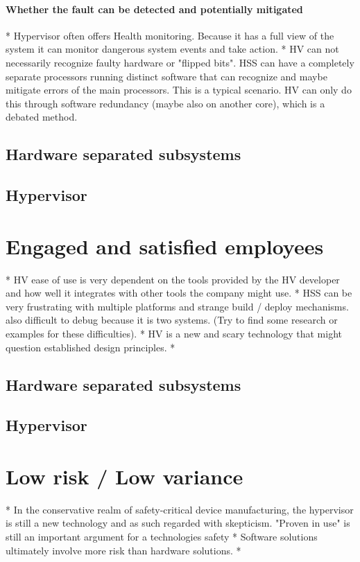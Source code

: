 \paragraph{Whether the fault can be detected and potentially mitigated}
* Hypervisor often offers Health monitoring. Because it has a full view of the system it can monitor dangerous system events and take action.
* HV can not necessarily recognize faulty hardware or "flipped bits". HSS can have a completely separate processors running distinct software that can recognize and maybe mitigate errors of the main processors. This is a typical scenario. HV can only do this through software redundancy (maybe also on another core), which is a debated method.

\subsection{Hardware separated subsystems}
\subsection{Hypervisor}


\section{Engaged and satisfied employees}

* HV ease of use is very dependent on the tools provided by the HV developer and how well it integrates with other tools the company might use.
* HSS can be very frustrating with multiple platforms and strange build / deploy mechanisms. also difficult to debug because it is two systems. (Try to find some research or examples for these difficulties).
* HV is a new and scary technology that might question established design principles.
* 
\subsection{Hardware separated subsystems}
\subsection{Hypervisor}


\section{Low risk / Low variance}
* In the conservative realm of safety-critical device manufacturing, the hypervisor is still a new technology and as such regarded with skepticism. "Proven in use" is still an important argument for a technologies safety
* Software solutions ultimately involve more risk than hardware solutions.
* 
